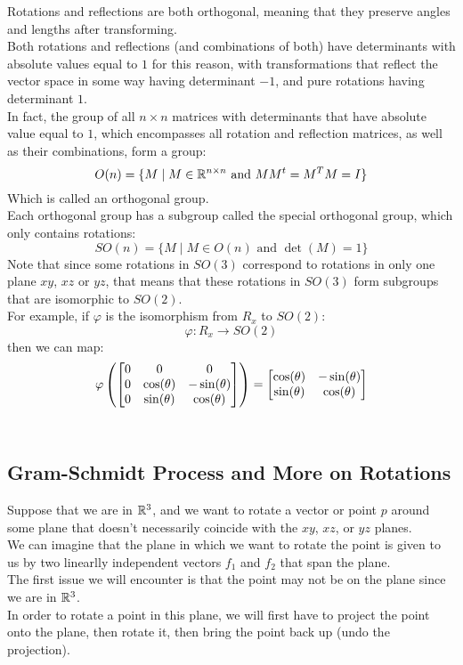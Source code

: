 \documentclass[12pt]{article}
\begin{document}
Rotations and reflections are both
orthogonal, meaning that they preserve
angles and lengths after transforming. \\
Both rotations and reflections
(and combinations of both)
have determinants with absolute values
equal to $1$ for this reason,
with transformations that reflect
the vector space in some way having
determinant $-1$,
and pure rotations having determinant $1$. \\

In fact, the group of all $n \times n$
matrices with determinants
that have absolute value equal to $1$,
which encompasses all rotation and reflection
matrices, as well as their combinations,
form a group:
\[ O(n) = \{ M \mid M \in \mathbb{R}^{n \times n}
\text{ and } MM^t = M^TM = I \} \]
Which is called an orthogonal group. \\

Each orthogonal group has a
subgroup called the special
orthogonal group, which only contains
rotations:
\[ SO(n) = \{ M \mid M \in O(n)
\text{ and } \det(M) = 1 \} \]
Note that since some
rotations in $SO(3)$
correspond to rotations in only
one plane $xy$, $xz$ or $yz$,
that means that these rotations
in $SO(3)$ form subgroups that are
isomorphic to $SO(2)$. \\

For example, if $\varphi$
is the isomorphism from $R_x$
to $SO(2)$:
\[ \varphi: R_x \to SO(2) \]
then we can map:
\[ \varphi\left( 
\begin{bmatrix} 0 & 0 & 0 \\ 0 & \cos(\theta) & -\sin(\theta) \\ 0 & \sin(\theta) & \cos(\theta) \end{bmatrix} \right)
= \begin{bmatrix} \cos(\theta) & -\sin(\theta) \\ \sin(\theta) & \cos(\theta) \end{bmatrix} \] \\

\newpage

\subsection*{Gram-Schmidt Process and
More on Rotations}

Suppose that we are in $\mathbb{R}^3$,
and we want to rotate
a vector or point $p$ around some plane
that doesn't necessarily coincide
with the $xy$, $xz$, or $yz$ planes. \\

We can imagine that the plane in which we
want to rotate the point is given to
us by two linearlly independent vectors
$f_1$ and $f_2$ that span the plane. \\

The first issue we will encounter is that
the point may not be on the plane
since we are in $\mathbb{R}^3$. \\
In order to rotate a point in this plane,
we will first have to project the point
onto the plane,
then rotate it, then bring the point back up
(undo the projection). \\
\end{document}
